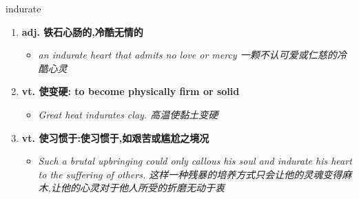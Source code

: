 
\begin{frame}
{\huge indurate}
\begin{center}
\begin{enumerate}\Large
  \item \textbf{adj. 铁石心肠的,冷酷无情的}
  \begin{itemize}
    \item \em{\Large{an indurate heart that admits no love or mercy 一颗不认可爱或仁慈的冷酷心灵}}
  \end{itemize}
  \item \textbf{vt. 使变硬: to become physically firm or solid}
  \begin{itemize}
    \item \em{\Large{Great heat indurates clay. 高温使黏土变硬}}
  \end{itemize}
  \item \textbf{vt. 使习惯于:使习惯于,如艰苦或尴尬之境况}
  \begin{itemize}
    \item \em{\Large{Such a brutal upbringing could only callous his soul and indurate his heart to the suffering of others. 这样一种残暴的培养方式只会让他的灵魂变得麻木,让他的心灵对于他人所受的折磨无动于衷}}
  \end{itemize}
\end{enumerate}
\end{center}
\end{frame}
